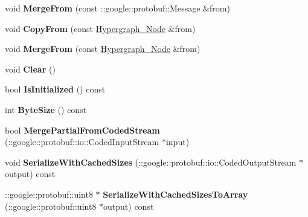 \begin{DoxyCompactItemize}
\item 
\hypertarget{classHypergraph__Node_a86b37cd7bd563958a5854440ecacfd78}{
void {\bfseries MergeFrom} (const ::google::protobuf::Message \&from)}
\label{classHypergraph__Node_a86b37cd7bd563958a5854440ecacfd78}

\item 
\hypertarget{classHypergraph__Node_a7cbc530171a8036783952f6dc56c5c67}{
void {\bfseries CopyFrom} (const \hyperlink{classHypergraph__Node}{Hypergraph\_\-Node} \&from)}
\label{classHypergraph__Node_a7cbc530171a8036783952f6dc56c5c67}

\item 
\hypertarget{classHypergraph__Node_a459f2e561a40bd7fd3222b73dda89d8d}{
void {\bfseries MergeFrom} (const \hyperlink{classHypergraph__Node}{Hypergraph\_\-Node} \&from)}
\label{classHypergraph__Node_a459f2e561a40bd7fd3222b73dda89d8d}

\item 
\hypertarget{classHypergraph__Node_acc9fbbcc5ad55e598d95757849bf02d3}{
void {\bfseries Clear} ()}
\label{classHypergraph__Node_acc9fbbcc5ad55e598d95757849bf02d3}

\item 
\hypertarget{classHypergraph__Node_ade66b64dfb3992afdb22a539e093480a}{
bool {\bfseries IsInitialized} () const }
\label{classHypergraph__Node_ade66b64dfb3992afdb22a539e093480a}

\item 
\hypertarget{classHypergraph__Node_a7b0650e4259ade4af4f4199339084c9c}{
int {\bfseries ByteSize} () const }
\label{classHypergraph__Node_a7b0650e4259ade4af4f4199339084c9c}

\item 
\hypertarget{classHypergraph__Node_a1a8a82dd55ff8a347d315b1656a56c3f}{
bool {\bfseries MergePartialFromCodedStream} (::google::protobuf::io::CodedInputStream $\ast$input)}
\label{classHypergraph__Node_a1a8a82dd55ff8a347d315b1656a56c3f}

\item 
\hypertarget{classHypergraph__Node_aef948b6f1a9433485edd286239868600}{
void {\bfseries SerializeWithCachedSizes} (::google::protobuf::io::CodedOutputStream $\ast$output) const }
\label{classHypergraph__Node_aef948b6f1a9433485edd286239868600}

\item 
\hypertarget{classHypergraph__Node_a0aadc6849d483bd27ede9c9af7606660}{
::google::protobuf::uint8 $\ast$ {\bfseries SerializeWithCachedSizesToArray} (::google::protobuf::uint8 $\ast$output) const }
\label{classHypergraph__Node_a0aadc6849d483bd27ede9c9af7606660}


\end{DoxyCompactItemize}
